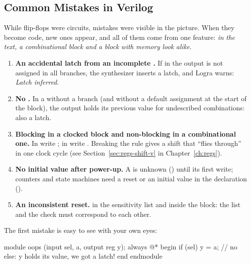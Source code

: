 \subsection{Common Mistakes in Verilog}

While flip-flops were circuits, mistakes were visible in the picture. When they
become code, new ones appear, and all of them come from one feature:
\emph{in the text, a combinational block and a block with memory look alike}.

\begin{warnbox}
\begin{enumerate}
  \item \textbf{An accidental latch from an incomplete .} If in
         the output is not assigned in all branches, the
        synthesizer inserts a latch, and Logra warns: \emph{Latch inferred}.
  \item \textbf{No .} In a  without a 
        branch (and without a default assignment at the start of the block), the
        output holds its previous value for undescribed combinations: also a
        latch.
  \item \textbf{Blocking \code{=} in a clocked block and non-blocking \code{<=} in
        a combinational one.} In  write \code{<=}; in
         write \code{=}. Breaking the rule gives a shift that
        ``flies through'' in one clock cycle (see
        Section~\ref{sec:regs-shift-v} in Chapter~\ref{ch:regs}).
  \item \textbf{No initial value after power-up.} A  is unknown
        () until its first write; counters and state machines need a reset
        or an initial value in the declaration ().
  \item \textbf{An inconsistent reset.}  in the
        sensitivity list and  inside the block: the list and the
        check must correspond to each other.
\end{enumerate}
\end{warnbox}

The first mistake is easy to see with your own eyes:

\begin{vcode}
module oops (input sel, a, output reg y);
    always @* begin
        if (sel) y = a;      // no else: y holds its value, we got a latch!
    end
endmodule
\end{vcode}

